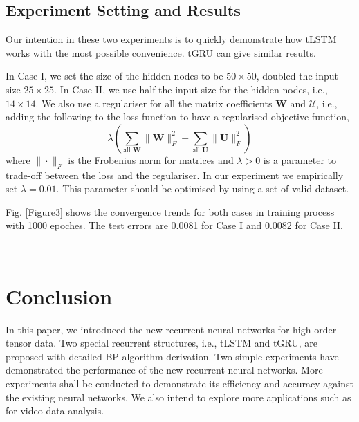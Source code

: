 \documentclass[journal]{IEEEtran}
\begin{document}
\subsection{Experiment Setting and Results}
Our intention in these two experiments is to quickly 
demonstrate how tLSTM works with the most possible convenience. tGRU can give similar results. 

In Case I, we set the size of the hidden nodes to be $50 \times 50$, doubled the input size $25\times 25$.  In Case II, we use half the input size for the hidden nodes, i.e., $14\times 14$. We also use a regulariser for all the matrix coefficients $\mathbf W$ and $\mathcal U$, i.e., adding the following to the loss function to have a regularised objective function,
\[
\lambda \left( \sum_{\text{all }\mathbf W} \|\mathbf W\|^2_F + \sum_{\text{all }\mathbf U} \|\mathbf U\|^2_F\right)
\]
where $\|\cdot\|_F$ is the Frobenius norm for matrices and $\lambda>0$ is a parameter to trade-off between the loss and the regulariser. In our experiment we empirically set $\lambda = 0.01$.  This parameter should be optimised by using a set of valid dataset.
 
Fig. \ref{Figure3} shows the convergence trends for both cases in training process with 1000 epoches. The test errors are 0.0081 for Case I and 0.0082 for Case II.
\begin{figure*}[h]
\centering
{}\ \ \ \ 
\caption{Convergence Trends for Two Cases.}
\label{Figure3}
\end{figure*}
\section{Conclusion} \label{Sec:5} 
In this paper, we introduced the new recurrent neural networks  for
high-order tensor data. Two special recurrent structures, i.e., tLSTM and tGRU, are proposed with detailed BP algorithm derivation. Two simple experiments have demonstrated the performance of the new recurrent neural networks. More experiments shall be conducted to demonstrate its efficiency and accuracy against the existing neural networks. We also intend to explore more applications such as for video data analysis. 



\end{document}
